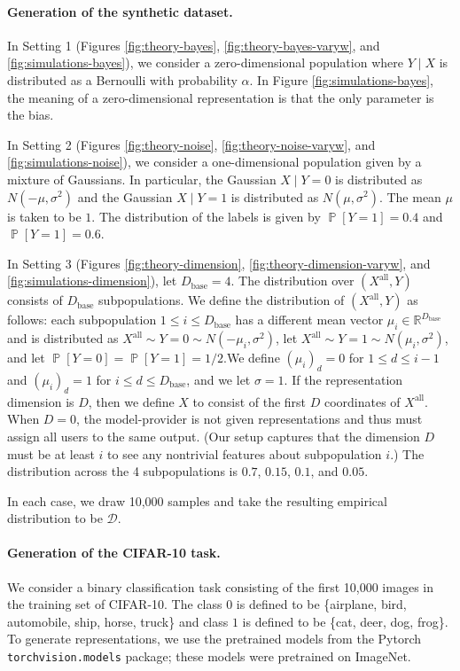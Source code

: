 \documentclass[letterpaper,11pt]{article}
\theoremstyle{plain}
\DeclareMathOperator*{\Prob}{\mathbb{P}}
\begin{document}
\paragraph{Generation of the synthetic dataset.}
In Setting 1 (Figures \ref{fig:theory-bayes}, \ref{fig:theory-bayes-varyw}, and \ref{fig:simulations-bayes}), we consider a zero-dimensional population where $Y \mid X$ is distributed as a Bernoulli with probability $\alpha$. In Figure \ref{fig:simulations-bayes}, the meaning of a zero-dimensional representation is that the only parameter is the bias. 

In Setting 2 (Figures \ref{fig:theory-noise}, \ref{fig:theory-noise-varyw}, and \ref{fig:simulations-noise}), we consider a one-dimensional population given by a mixture of Gaussians. In particular, the Gaussian $X \mid Y = 0$ is distributed as $N(-\mu, \sigma^2)$ and the Gaussian $X \mid Y = 1$ is distributed as $N(\mu, \sigma^2)$. The mean $\mu$ is taken to be $1$. The distribution of the labels is given by $\Prob[Y = 1] = 0.4$ and $\Prob[Y = 1] = 0.6$. 

In Setting 3 (Figures \ref{fig:theory-dimension}, \ref{fig:theory-dimension-varyw}, and \ref{fig:simulations-dimension}),  let $D_{\text{base}} = 4$. The distribution over $(X^{\text{all}}, Y)$ consists of $D_{\text{base}}$ subpopulations. We define the distribution of $(X^{\text{all}}, Y)$ as follows: each subpopulation $1 \le i \le D_{\text{base}}$ has a different mean vector $\mu_i \in \mathbb{R}^{D_{\text{base}}}$ and is distributed as $X^{\text{all}} \sim Y = 0 \sim N(-\mu_i, \sigma^2)$, let $X^{\text{all}} \sim Y = 1 \sim N(\mu_i, \sigma^2)$, and let $\Prob[Y = 0] = \Prob[Y = 1] = 1/2$.We define $(\mu_i)_d = 0$ for $1 \le d \le i-1$ and $(\mu_i)_d = 1$ for $i \le d \le D_{\text{base}}$, and we let $\sigma = 1$. If the representation dimension is $D$, then we define $X$ to consist of the first $D$ coordinates of $X^{\text{all}}$. When $D = 0$, the model-provider is not given representations and thus must assign all users to the same output. (Our setup captures that the dimension $D$ must be at least $i$ to see any nontrivial features about subpopulation $i$.) The distribution across the 4 subpopulations is $0.7$, $0.15$, $0.1$, and $0.05$. 

In each case, we draw 10,000 samples and take the resulting empirical distribution to be $\mathcal{D}$. 

\paragraph{Generation of the CIFAR-10 task.}
We consider a binary classification task consisting of the first 10,000 images in the training set of CIFAR-10. The class $0$ is defined to be  \{airplane, bird, automobile, ship, horse, truck\} and class $1$ is defined to be \{cat, deer, dog, frog\}. To generate representations, we use the pretrained models from the Pytorch \texttt{torchvision.models} package; these models were pretrained on ImageNet. 
\end{document}
